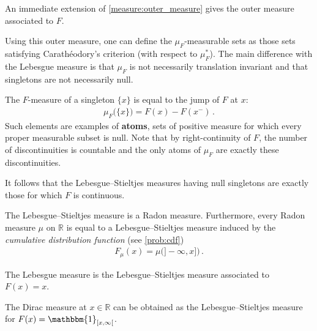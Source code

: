     An immediate extension of \cref{measure:outer_measure} gives the outer measure associated to $F$.

    Using this outer measure, one can define the $\mu_F$-measurable sets as those sets satisfying Carath\'eodory's criterion (with respect to $\mu_F^*$). The main difference with the Lebesgue measure is that $\mu_F$ is not necessarily translation invariant and that singletons are not necessarily null.
    \begin{property}[Singletons]
        The $F$-measure of a singleton $\{x\}$ is equal to the jump of $F$ at $x$:
        \begin{gather}
            \mu_F\bigl(\{x\}\bigr) = F(x) - F(x^-)\,.
        \end{gather}
        Such elements are examples of \textbf{atoms}, sets of positive measure for which every proper measurable subset is null. Note that by right-continuity of $F$, the number of discontinuities is countable and the only atoms of $\mu_F$ are exactly these discontinuities.
    \end{property}
    \begin{result}
        It follows that the Lebesgue--Stieltjes measures having null singletons are exactly those for which $F$ is continuous.
    \end{result}

    \begin{property}[Regularity]
        The Lebesgue--Stieltjes measure is a Radon measure. Furthermore, every Radon measure $\mu$ on $\mathbb{R}$ is equal to a Lebesgue--Stieltjes measure induced by the \textit{cumulative distribution function} (see \cref{prob:cdf})
        \begin{gather}
            F_\mu(x) = \mu\bigl(]-\!\infty,x]\bigr)\,.
        \end{gather}
    \end{property}

    \begin{example}
        The Lebesgue measure is the Lebesgue--Stieltjes measure associated to $F(x)=x$.
    \end{example}
    \begin{example}
        The Dirac measure at $x\in\mathbb{R}$ can be obtained as the Lebesgue--Stieltjes measure for $F(x)=\mathbbm{1}_{[x,\infty[}$.
    \end{example}

